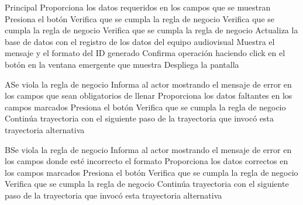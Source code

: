 
\begin{UCtrayectoria}{Principal}
		\UCpaso[\UCactor] Proporciona los datos requeridos en los campos que se muestran 
		\UCpaso[\UCactor] Presiona el botón  
		\UCpaso[\UCsist] Verifica que se cumpla la regla de negocio  
		\UCpaso[\UCsist] Verifica que se cumpla la regla de negocio  
		\UCpaso[\UCsist] Verifica que se cumpla la regla de negocio  
		\UCpaso[\UCsist] Actualiza la base de datos con el registro de los datos del equipo audiovisual 
		\UCpaso[\UCsist] Muestra el mensaje  y el formato del ID generado
		\UCpaso[\UCactor] Confirma operación haciendo click en el botón  en la ventana emergente que muestra
		\UCpaso[\UCsist] Despliega la pantalla 
\end{UCtrayectoria}



\begin{UCtrayectoriaA}{A}{Se viola la regla de negocio }	
			\UCpaso[\UCsist] Informa al actor mostrando el mensaje de error  en los campos que sean obligatorios de llenar
			\UCpaso[\UCactor] Proporciona los datos faltantes en los campos marcados 
			\UCpaso[\UCactor] Presiona el botón  
			\UCpaso[\UCactor] Verifica que se cumpla la regla de negocio  
			\UCpaso[\UCsist] Continúa trayectoria con el siguiente paso de la trayectoria que invocó esta trayectoria alternativa
\end{UCtrayectoriaA}


\begin{UCtrayectoriaA}{B}{Se viola la regla de negocio }	
			\UCpaso[\UCsist] Informa al actor mostrando el mensaje de error  en los campos donde esté incorrecto el formato
			\UCpaso[\UCactor] Proporciona los datos correctos en los campos marcados 
			\UCpaso[\UCactor] Presiona el botón   
			\UCpaso[\UCsist] Verifica que se cumpla la regla de negocio  
		\UCpaso[\UCsist] Verifica que se cumpla la regla de negocio  
			\UCpaso[\UCsist] Continúa trayectoria con el siguiente paso de la trayectoria que invocó esta trayectoria alternativa
\end{UCtrayectoriaA}

